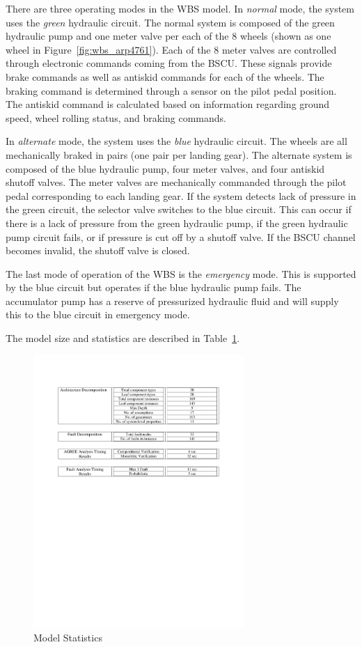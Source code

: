 There are three operating modes in the WBS model. In \textit{normal} mode, the system uses the \textit{green} hydraulic circuit. The normal system is composed of the green hydraulic pump and one meter valve per each of the 8 wheels (shown as one wheel in Figure~\ref{fig:wbs_arp4761}). Each of the 8 meter valves are controlled through electronic commands coming from the BSCU. These signals provide brake commands as well as antiskid commands for each of the wheels. The braking command is determined through a sensor on the pilot pedal position. The antiskid command is calculated based on information regarding ground speed, wheel rolling status, and braking commands.

In \textit{alternate} mode, the system uses the \textit{blue} hydraulic circuit.  The wheels are all mechanically braked in pairs (one pair per landing gear). The alternate system is composed of the blue hydraulic pump, four meter valves, and four antiskid shutoff valves. The meter valves are mechanically commanded through the pilot pedal corresponding to each landing gear. If the system detects lack of pressure in the green circuit, the selector valve switches to the blue circuit. This can occur if there is a lack of pressure from the green hydraulic pump, if the green hydraulic pump circuit fails, or if pressure is cut off by a shutoff valve. If the BSCU channel becomes invalid, the shutoff valve is closed.

The last mode of operation of the WBS is the \textit{emergency} mode. This is supported by the blue circuit but operates if the blue hydraulic pump fails. The accumulator pump has a reserve of pressurized hydraulic fluid and will supply this to the blue circuit in emergency mode.

The model size and statistics are described in Table~\ref{fig:arch_table}. 

\begin{figure}[h]
\begin{center}
\includegraphics[width=8cm]{images/arch_table.pdf}
\caption{Model Statistics} \label{fig:arch_table}
\end{center}
\end{figure}

